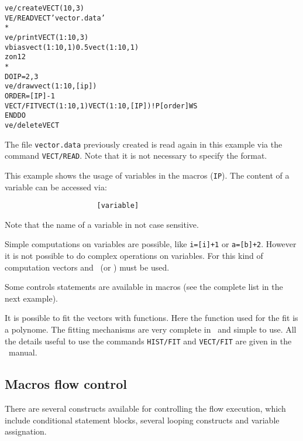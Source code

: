 \begin{alltt}
      ve/create VECT(10,3)
     VE/READ VECT 'vector.data'
      *
      ve/print VECT(1:10,3)
      vbias vect(1:10,1) 0.5 vect(1:10,1)
      zon 1 2
      *
     DO IP = 2,3
        ve/draw vect(1:10,[ip])
     ORDER = [IP] - 1
       VECT/FIT VECT(1:10,1) VECT(1:10,[IP]) ! P[order] WS
     ENDDO
      ve/delete VECT
\end{alltt} 
\begin{DinglistE}
\item The file {\tt vector.data} previously created is read again in
      this example via the command {\tt VECT/READ}. Note that it
      is not necessary to specify the format. 
\item This example shows the usage of variables in the macros ({\tt IP}).
      The content of a variable can be accessed via:
\begin{verbatim}
                      [variable]
\end{verbatim}
      Note that the name of a variable in not case sensitive.
\item Simple computations on variables are possible, like {\tt i=[i]+1}
      or {\tt a=[b]+2}. However it is not possible to do complex operations
      on variables. For this kind of computation vectors and \SIGMA\
      (or \COMIS) must be used.
\item Some controls statements are available in macros (see the complete
      list in the next example).
\item It is possible to fit the vectors with functions. Here the
      function used for the fit is a polynome. The fitting mechanisms are very
      complete in \PAW\ and simple to use. All the details useful to use the
      commands {\tt HIST/FIT} and {\tt VECT/FIT} are given in the \PAW\ manual.
\end{DinglistE}

\clearpage

\subsection{Macros flow control}

There are several constructs available for controlling the flow execution,
which include conditional statement blocks, several looping constructs and
variable assignation.

